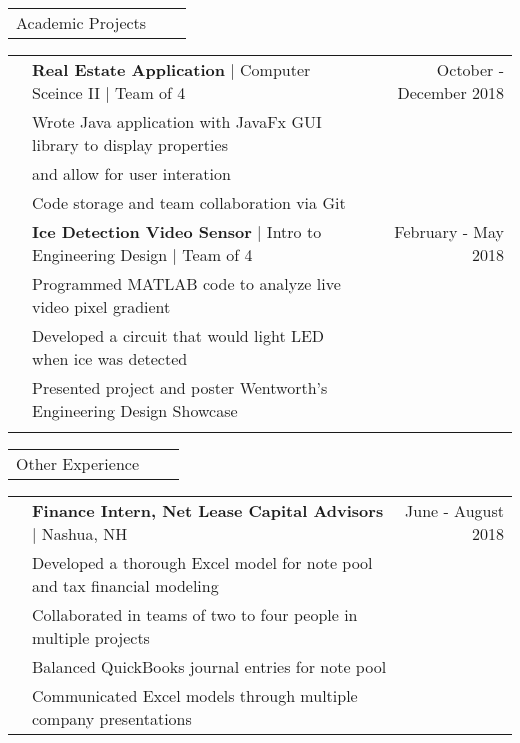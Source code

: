 \documentclass[letterpaper,10pt,oneside]{article}
\begin{document}
 \noindent \begin{tabularx}{\linewidth}{@{} l l R } 
     \Large{Academic Projects}\\
 \end{tabularx}
 \noindent \begin{tabularx}{\linewidth}{@{} l l R }     
     & \textbf{Real Estate Application} $\mid$ Computer Sceince II $\mid$ Team of 4 & October - December 2018 \\
     &Wrote Java application with JavaFx GUI library to display properties\\
     &\indent and allow for user interation\\
     &Code storage and team collaboration via Git\\
     & \textbf{Ice Detection Video Sensor} $\mid$ Intro to Engineering Design $\mid$ Team of 4 & February - May 2018 \\
     &Programmed MATLAB code to analyze live video pixel gradient\\
     &Developed a circuit that would light LED when ice was detected\\
     &Presented project and poster Wentworth's Engineering Design Showcase\\
     \\
\end{tabularx}

 \noindent \begin{tabularx}{\linewidth}{@{} l l R }
     \Large{Other Experience}\\
 \end{tabularx}     
 \noindent \begin{tabularx}{\linewidth}{@{} l l R }     
     & \textbf{Finance Intern, Net Lease Capital Advisors} $\mid$ Nashua, NH & June - August 2018 \\
     &Developed a thorough Excel model for note pool and tax financial modeling\\
     &Collaborated in teams of two to four people in multiple projects\\
     &Balanced QuickBooks journal entries for note pool\\
     &Communicated Excel models through multiple company presentations\\
 \end{tabularx}     
\end{document}
